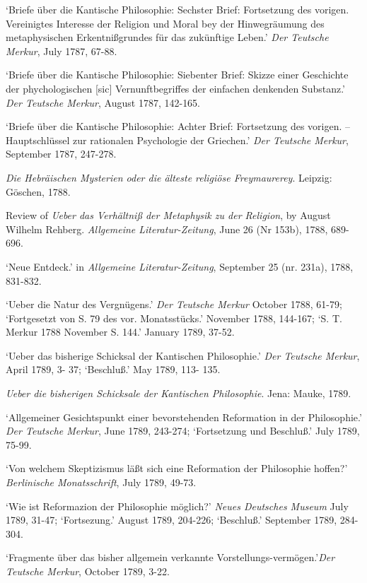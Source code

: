 `Briefe \"{u}ber die Kantische Philosophie: Sechster Brief: Fortsetzung des vorigen. Vereinigtes Interesse der Religion und Moral bey der Hinwegr\"{a}umung des metaphysischen Erkentni\ss{}grundes f\"{u}r das zuk\"{u}nftige Leben.' \textit{Der Teutsche Merkur}, July 1787, 67{-}88.

`Briefe \"{u}ber die Kantische Philosophie: Siebenter Brief: Skizze einer Geschichte der phychologischen [sic] Vernunftbegriffes der einfachen denkenden Substanz.' \textit{Der Teutsche Merkur}, August 1787, 142{-}165.

`Briefe \"{u}ber die Kantische Philosophie: Achter Brief: Fortsetzung des vorigen. {--} Hauptschl\"{u}ssel zur rationalen Psychologie der Griechen.' \textit{Der Teutsche Merkur}, September 1787, 247{-}278. 

\textit{Die Hebr\"{a}ischen Mysterien oder die \"{a}lteste religi\"{o}se Freymaurerey}. Leipzig: G\"{o}schen, 1788.

Review of \textit{Ueber das Verh\"{a}ltni\ss{} der Metaphysik zu der Religion}, by August Wilhelm Rehberg. \textit{Allgemeine Literatur{-}Zeitung}, June 26 (Nr 153b), 1788, 689{-}696.

`Neue Entdeck.' in \textit{Allgemeine Literatur{-}Zeitung}, September 25 (nr. 231a), 1788, 831{-}832.

`Ueber die Natur des Vergn\"{u}gens.' \textit{Der Teutsche Merkur} October 1788, 61{-}79; `Fortgesetzt von S. 79 des vor. Monatsst\"{u}cks.' November 1788, 144{-}167; `S. T. Merkur 1788 November S. 144.' January 1789, 37{-}52. 

`Ueber das bisherige Schicksal der Kantischen Philosophie.' \textit{Der Teutsche Merkur}, April 1789, 3{-} 37; `Beschlu\ss{}.' May 1789, 113{-} 135.

\textit{Ueber die bisherigen Schicksale der Kantischen Philosophie}. Jena: Mauke, 1789.

`Allgemeiner Gesichtspunkt einer bevorstehenden Reformation in der Philosophie.' \textit{Der Teutsche Merkur}, June 1789, 243{-}274; `Fortsetzung und Beschlu\ss{}.' July 1789, 75{-}99.

`Von welchem Skeptizismus l\"{a}\ss{}t sich eine Reformation der Philosophie hoffen?' \textit{Berlinische Monatsschrift}, July 1789, 49{-}73.

`Wie ist Reformazion der Philosophie m\"{o}glich?' \textit{Neues Deutsches Museum} July 1789, 31{-}47; `Fortsezung.' August 1789, 204{-}226; `Beschlu\ss{}.' September 1789, 284{-}304.

 `Fragmente \"{u}ber das bisher allgemein verkannte Vorstellungs{-}verm\"{o}gen.'\textit{Der Teutsche Merkur}, October 1789, 3{-}22.

